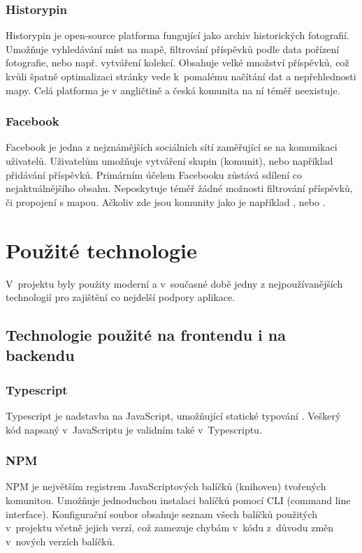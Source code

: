 \documentclass[12pt, a4paper,
  oneside,      %
]{report}
\begin{document}
\subsection{Historypin}
Historypin je open-source platforma fungující jako archiv historických fotografií. Umožňuje vyhledávání míst na mapě, filtrování příspěvků podle data pořízení fotografie, nebo např. vytváření kolekcí. Obsahuje velké množství příspěvků, což kvůli špatně optimalizaci stránky vede k~pomalému načítání dat a nepřehlednosti mapy. Celá platforma je v angličtině a česká komunita na ní téměř neexistuje.

\subsection{Facebook}
Facebook je jedna z nejznámějších sociálních sítí zaměřující se na komunikaci uživatelů. Uživatelům umožňuje vytváření skupin (komunit), nebo například přidávání příspěvků. Primárním účelem Facebooku zůstává sdílení co nejaktuálnějšího obsahu. Neposkytuje téměř žádné možnosti filtrování příspěvků, či propojení s mapou. Ačkoliv zde jsou komunity  jako je například , nebo .

\chapter{Použité technologie}
V~projektu byly použity moderní a v~současné době jedny z nejpoužívanějších technologií pro zajištění co nejdelší podpory aplikace.
\section{Technologie použité na frontendu i na backendu}
\subsection{Typescript}
Typescript je nadstavba na JavaScript, umožňující statické typování \cite{DynamicVsStaticTyping}. Veškerý kód napsaný v~JavaScriptu je validním také v~Typescriptu. \cite{whatIsTypescript}\cite{typescriptForTheNewProgrammer}

\subsection{NPM}
NPM je největším registrem JavaScriptových balíčků (knihoven) tvořených komunitou. Umožňuje jednoduchou instalaci balíčků pomocí CLI (command line interface). Konfigurační soubor obsahuje seznam všech balíčků použitých v~projektu včetně jejich verzí, což zamezuje chybám v~kódu z~důvodu změn v~nových verzích balíčků. \cite{whatIsNpmW3}\cite{aboutNpm}
\end{document}
